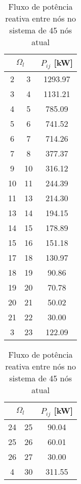 \begin{table}[H]\footnotesize
    \caption{Fluxo de potência reativa entre nós no sistema de 45 nós atual}
    \label{tab:fluxo_kW_atual}
    \begin{minipage}{.5\linewidth}
        \centering
        \begin{tabular}{|c|c|c|}
            \hline
            \multicolumn{2}{|c|}{$\Omega_l$} & $P_{ij}$ [kW]  \\ \hline
             2 &   3 & 1293.97\\ \hline
             3 &   4 & 1131.21\\ \hline
             4 &   5 &  785.09\\ \hline
             5 &   6 &  741.52\\ \hline
             6 &   7 &  714.26\\ \hline
             7 &   8 &  377.37\\ \hline
             9 &  10 &  316.12\\ \hline
            10 &  11 &  244.39\\ \hline
            11 &  13 &  214.30\\ \hline
            13 &  14 &  194.15\\ \hline
            14 &  15 &  178.89\\ \hline
            15 &  16 &  151.18\\ \hline
            17 &  18 &  130.97\\ \hline
            18 &  19 &   90.86\\ \hline
            19 &  20 &   70.78\\ \hline
            20 &  21 &   50.02\\ \hline
            21 &  22 &   30.00\\ \hline
             3 &  23 &  122.09\\ \hline
        \end{tabular}
    \end{minipage}%
    \begin{minipage}{.5\linewidth}
        \centering
        \begin{tabular}{|c|c|c|}
            \hline
            \multicolumn{2}{|c|}{$\Omega_l$} & $P_{ij}$ [kW]  \\ 
            \hline
            24 &  25 &   90.04\\ \hline
            25 &  26 &   60.01\\ \hline
            26 &  27 &   30.00\\ \hline
             4 &  30 &  311.55\\ \hline

\end{tabular}
\end{minipage}
\end{table}
